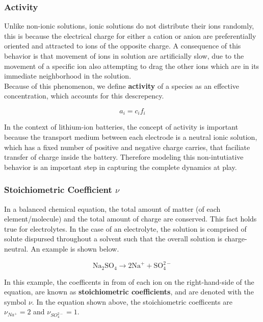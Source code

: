 \documentclass[lettersize,journal]{IEEEtran}
\begin{document}
\subsubsection{Activity}

Unlike non-ionic solutions, ionic solutions do not distribute their ions randomly, this is because the electrical charge for either a cation or anion are preferentially oriented and attracted to ions of the opposite charge. A consequence of this behavior is that movement of ions in solution are artificially slow, due to the movement of a specific ion also attempting to drag the other ions which are in its immediate neighborhood in the solution. \\

Because of this phenomenon, we define \textbf{activity} of a species as an effective concentration, which accounts for this descrepency.

\begin{equation}\label{activity}
  a_i = c_i f_i
\end{equation}

In the context of lithium-ion batteries, the concept of activity is important because the transport medium between each electrode is a neutral ionic solution, which has a fixed number of positive and negative charge carries, that faciliate transfer of charge inside the battery. Therefore modeling this non-intutiative behavior is an important step in capturing the complete dynamics at play. \\

\subsubsection{ Stoichiometric Coefficient $\nu$ }
In a balanced chemical equation, the total amount of matter (of each element/molecule) and the total amount of charge are conserved. This fact holds true for electrolytes. In the case of an electrolyte, the solution is comprised of solute dispursed throughout a solvent such that the overall solution is charge-neutral. An example is shown below.

\begin{equation}
  \mathrm{Na}_{2} \mathrm{SO}_{4} \rightarrow 2 \mathrm{Na}^{+}+\mathrm{SO}_{4}^{2-}
\end{equation}

In this example, the coefficents in from of each ion on the right-hand-side of the equation, are known as \textbf{stoichiometric coefficients}, and are denoted with the symbol $\nu$. In the equation shown above, the stoichiometric coefficents are $\nu_{Na^{+}} = 2$ and $\nu_{SO_{4}^{2-}} = 1$.
\end{document}
